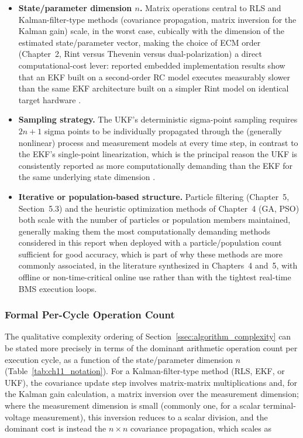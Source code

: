 \begin{itemize}
	\item \textbf{State/parameter dimension $n$.} Matrix operations central to RLS and Kalman-filter-type methods (covariance propagation, matrix inversion for the Kalman gain) scale, in the worst case, cubically with the dimension of the estimated state/parameter vector, making the choice of ECM order (Chapter~2, Rint versus Thevenin versus dual-polarization) a direct computational-cost lever: reported embedded implementation results show that an EKF built on a second-order RC model executes measurably slower than the same EKF architecture built on a simpler Rint model on identical target hardware \cite{energy_efficient_soc_embedded_2024}.
	\item \textbf{Sampling strategy.} The UKF's deterministic sigma-point sampling requires $2n+1$ sigma points to be individually propagated through the (generally nonlinear) process and measurement models at every time step, in contrast to the EKF's single-point linearization, which is the principal reason the UKF is consistently reported as more computationally demanding than the EKF for the same underlying state dimension \cite{kf_comparison_complexity_mdpi_2023}.
	\item \textbf{Iterative or population-based structure.} Particle filtering (Chapter~5, Section~5.3) and the heuristic optimization methods of Chapter~4 (GA, PSO) both scale with the number of particles or population members maintained, generally making them the most computationally demanding methods considered in this report when deployed with a particle/population count sufficient for good accuracy, which is part of why these methods are more commonly associated, in the literature synthesized in Chapters~4 and~5, with offline or non-time-critical online use rather than with the tightest real-time BMS execution loops.
\end{itemize}

\subsubsection{Formal Per-Cycle Operation Count}

The qualitative complexity ordering of Section~\ref{ssec:algorithm_complexity} can be stated more precisely in terms of the dominant arithmetic operation count per execution cycle, as a function of the state/parameter dimension $n$ (Table~\ref{tab:ch11_notation}). For a Kalman-filter-type method (RLS, EKF, or UKF), the covariance update step involves matrix-matrix multiplications and, for the Kalman gain calculation, a matrix inversion over the measurement dimension; where the measurement dimension is small (commonly one, for a scalar terminal-voltage measurement), this inversion reduces to a scalar division, and the dominant cost is instead the $n \times n$ covariance propagation, which scales as

